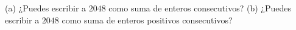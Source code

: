 (a) ¿Puedes escribir a $2048$ como suma de enteros consecutivos?  \newline 
(b) ¿Puedes escribir a $2048$ como suma de enteros positivos consecutivos?
